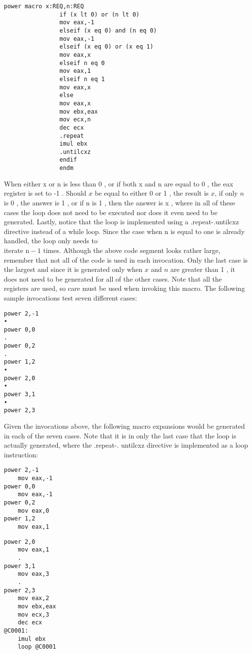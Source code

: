 \documentclass[10pt]{article}
\begin{document}
\begin{verbatim}
power macro x:REQ,n:REQ
                if (x lt 0) or (n lt 0)
                mov eax,-1
                elseif (x eq 0) and (n eq 0)
                mov eax,-1
                elseif (x eq 0) or (x eq 1)
                mov eax,x
                elseif n eq 0
                mov eax,1
                elseif n eq 1
                mov eax,x
                else
                mov eax,x
                mov ebx,eax
                mov ecx,n
                dec ecx
                .repeat
                imul ebx
                .untilcxz
                endif
                endm
\end{verbatim}

When either x or n is less than 0 , or if both x and n are equal to 0 , the eax register is set to -1 . Should $x$ be equal to either 0 or 1 , the result is $x$, if only $n$ is 0 , the answer is 1 , or if n is 1 , then the answer is x , where in all of these cases the loop does not need to be executed nor does it even need to be generated. Lastly, notice that the loop is implemented using a .repeat-.untilcxz directive instead of a while loop. Since the case when n is equal to one is already handled, the loop only needs to\\
iterate $\mathrm{n}-1$ times. Although the above code segment looks rather large, remember that not all of the code is used in each invocation. Only the last case is the largest and since it is generated only when $x$ and $n$ are greater than 1 , it does not need to be generated for all of the other cases. Note that all the registers are used, so care must be used when invoking this macro. The following sample invocations test seven different cases:

\begin{verbatim}
power 2,-1
•
power 0,0
.
power 0,2
.
power 1,2
•
power 2,0
•
power 3,1
•
power 2,3
\end{verbatim}

Given the invocations above, the following macro expansions would be generated in each of the seven cases. Note that it is in only the last case that the loop is actually generated, where the .repeat-. untilcxz directive is implemented as a loop instruction:

\begin{verbatim}
power 2,-1
    mov eax,-1
power 0,0
    mov eax,-1
power 0,2
    mov eax,0
power 1,2
    mov eax,1
\end{verbatim}

\begin{verbatim}
power 2,0
    mov eax,1
    .
power 3,1
    mov eax,3
    .
power 2,3
    mov eax,2
    mov ebx,eax
    mov ecx,3
    dec ecx
@C0001:
    imul ebx
    loop @C0001
\end{verbatim}
\end{document}
